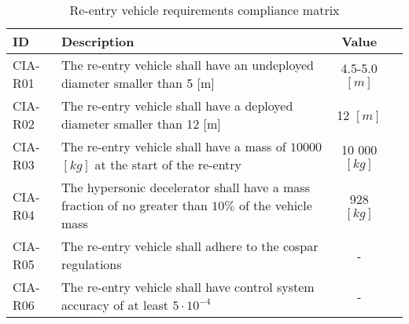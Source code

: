 \begin{table}[H]
\centering
	\caption{Re-entry vehicle requirements compliance matrix} 
	\label{tab:compv}
	\begin{tabular}{|p{}|p{}|c|c|}
	    \hline
	    ID          & Description   & Value &                                                                                           \\ \hline \hline
	CIA-R01 & The re-entry vehicle shall have an undeployed diameter smaller than 5 [m]                   & 4.5-5.0 $[m]$  & \cmark     				            \\ \hline
	CIA-R02 & The re-entry vehicle shall have a deployed diameter smaller than 12 [m]                     & 12 $[m]$ &  \cmark 				            \\ \hline	
	CIA-R03 & The re-entry vehicle shall have a mass of $10 000$ $[kg]$ at the start of the re-entry           & 10 000 $[kg]$ &  \cmark          				            \\ \hline
	CIA-R04 & The hypersonic decelerator shall have a mass fraction of no greater than $10\%$ of the vehicle mass	& 928 $[kg]$ & \cmark \\ \hline 
	CIA-R05 &  The re-entry vehicle shall adhere to the \gls{cospar} regulations  & - & \cmark \\ \hline
	CIA-R06 &  The re-entry vehicle shall have control system accuracy of at least $5\cdot 10^{-4}$ & - & \cmark \\ \hline
    \end{tabular}
\end{table}

\newpage
